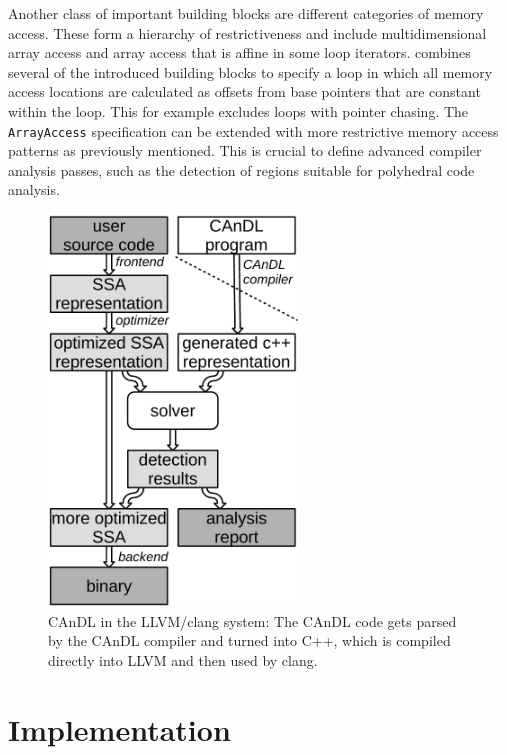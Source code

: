     Another class of important building blocks are different categories of
    memory access.
    These form a hierarchy of restrictiveness and include multidimensional array
    access and array access that is affine in some loop iterators.
     combines several of the introduced building blocks to
    specify a loop in which all memory access locations are calculated as
    offsets from base pointers that are constant within the loop.
    This for example excludes loops with pointer chasing.
    The {\tt ArrayAccess} specification can be extended with more restrictive
    memory access patterns as previously mentioned.
    This is crucial to define advanced compiler analysis passes, such as the
    detection of regions suitable for polyhedral code analysis.

\begin{figure}[t]
\centering
\includegraphics[width=0.59\textwidth]{figures/compilerFlow2.pdf}
\caption{CAnDL in the LLVM/clang system: The CAnDL code gets parsed by the
         CAnDL compiler and turned into C++, which is compiled directly
         into LLVM and then used by clang.
         \parfillskip=0pt}
\label{fig:build2}
\end{figure}

\section{Implementation}

